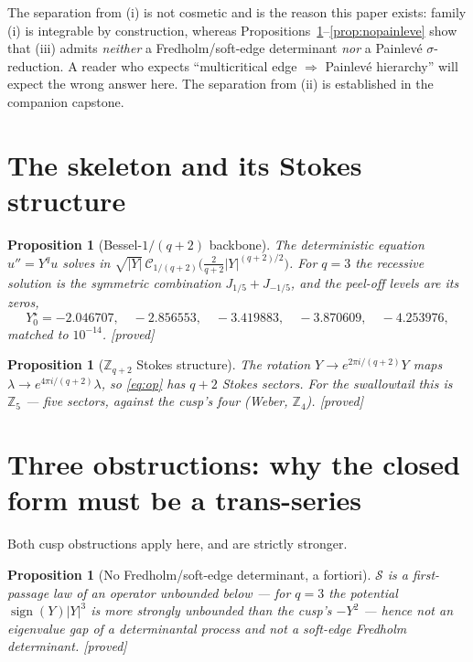 \documentclass[11pt,reqno]{amsart}
\theoremstyle{plain}
\newtheorem{proposition}[theorem]{Proposition}
\theoremstyle{definition}
\theoremstyle{remark}
\newcommand{\Sw}{\mathcal{S}}
\newcommand{\tagP}{{\footnotesize\textsf{[proved]}}}
\begin{document}
The separation from (i) is not cosmetic and is the reason this paper exists: family (i) is
integrable by construction, whereas Propositions~\ref{prop:nofredholm}--\ref{prop:nopainleve} show
that (iii) admits \emph{neither} a Fredholm/soft-edge determinant \emph{nor} a Painlev\'e
$\sigma$-reduction. A reader who expects ``multicritical edge $\Rightarrow$ Painlev\'e hierarchy''
will expect the wrong answer here. The separation from (ii) is established in the companion capstone.

\section{The skeleton and its Stokes structure}\label{sec:skeleton}

\begin{proposition}[Bessel-$1/(q{+}2)$ backbone]\label{prop:bessel}
The deterministic equation $u''=Y^qu$ solves in
$\sqrt{|Y|}\,\mathcal C_{1/(q+2)}\bigl(\tfrac{2}{q+2}|Y|^{(q+2)/2}\bigr)$. For $q=3$ the recessive
solution is the \emph{symmetric} combination $J_{1/5}+J_{-1/5}$, and the peel-off levels are its
zeros,
\[
Y^\star_0=-2.046707,\quad -2.856553,\quad -3.419883,\quad -3.870609,\quad -4.253976,
\]
matched to $10^{-14}$. \tagP
\end{proposition}

\begin{proposition}[$\mathbb Z_{q+2}$ Stokes structure]\label{prop:z5}
The rotation $Y\to e^{2\pi i/(q+2)}Y$ maps $\lambda\to e^{4\pi i/(q+2)}\lambda$, so \eqref{eq:op}
has $q+2$ Stokes sectors. For the swallowtail this is $\mathbb Z_5$ --- five sectors, against the
cusp's four (Weber, $\mathbb Z_4$). \tagP
\end{proposition}

\section{Three obstructions: why the closed form must be a trans-series}\label{sec:obstructions}

Both cusp obstructions apply here, and are strictly stronger.

\begin{proposition}[No Fredholm/soft-edge determinant, a fortiori]\label{prop:nofredholm}
$\Sw$ is a first-passage law of an operator unbounded below --- for $q=3$ the potential
$\operatorname{sign}(Y)|Y|^3$ is \emph{more} strongly unbounded than the cusp's $-Y^2$ --- hence not
an eigenvalue gap of a determinantal process and not a soft-edge Fredholm determinant. \tagP
\end{proposition}
\end{document}
